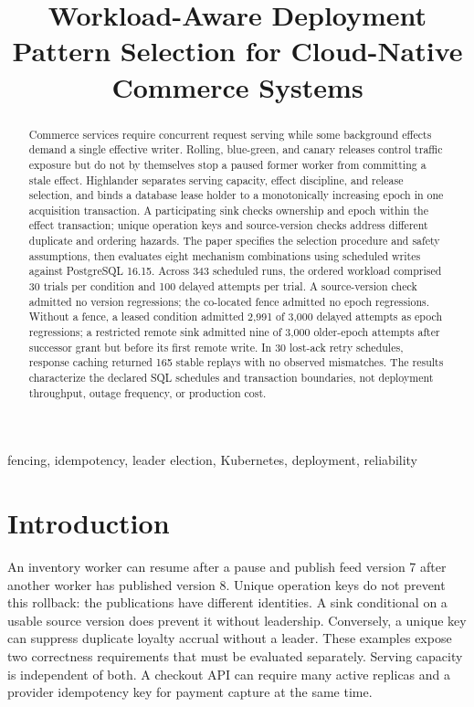 \documentclass[conference,10pt]{IEEEtran}
\title{Workload-Aware Deployment Pattern Selection for Cloud-Native Commerce Systems}
\author{\IEEEauthorblockN{Koteswararao Nallabothu}
\IEEEauthorblockA{Lead Software Engineer\\Lowe's\\Charlotte, NC, USA\\Nallabothukoteswar@gmail.com}
\and\IEEEauthorblockN{Naresh Alapati}
\IEEEauthorblockA{Principal Cloud Architect\\Walmart\\Bentonville, AR, USA\\narencachy@gmail.com}}
\begin{document}
\maketitle
\raggedbottom
\begin{abstract}
Commerce services require concurrent request serving while some background effects demand a single effective writer. Rolling, blue-green, and canary releases control traffic exposure but do not by themselves stop a paused former worker from committing a stale effect. Highlander separates serving capacity, effect discipline, and release selection, and binds a database lease holder to a monotonically increasing epoch in one acquisition transaction. A participating sink checks ownership and epoch within the effect transaction; unique operation keys and source-version checks address different duplicate and ordering hazards. The paper specifies the selection procedure and safety assumptions, then evaluates eight mechanism combinations using scheduled writes against PostgreSQL 16.15. Across 343 scheduled runs, the ordered workload comprised 30 trials per condition and 100 delayed attempts per trial. A source-version check admitted no version regressions; the co-located fence admitted no epoch regressions. Without a fence, a leased condition admitted 2,991 of 3,000 delayed attempts as epoch regressions; a restricted remote sink admitted nine of 3,000 older-epoch attempts after successor grant but before its first remote write. In 30 lost-ack retry schedules, response caching returned 165 stable replays with no observed mismatches. The results characterize the declared SQL schedules and transaction boundaries, not deployment throughput, outage frequency, or production cost.
\end{abstract}
\begin{IEEEkeywords}
fencing, idempotency, leader election, Kubernetes, deployment, reliability
\end{IEEEkeywords}

\section{Introduction}
An inventory worker can resume after a pause and publish feed version 7 after another worker has published version 8. Unique operation keys do not prevent this rollback: the publications have different identities. A sink conditional on a usable source version does prevent it without leadership. Conversely, a unique key can suppress duplicate loyalty accrual without a leader. These examples expose two correctness requirements that must be evaluated separately. Serving capacity is independent of both. A checkout API can require many active replicas and a provider idempotency key for payment capture at the same time.
\end{document}
